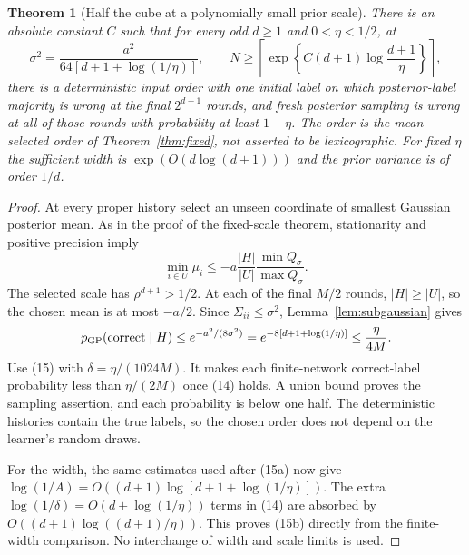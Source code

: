 \documentclass[11pt]{article}
\newtheorem{theorem}{Theorem}
\begin{document}
\begin{theorem}[Half the cube at a polynomially small prior scale]
There is an absolute constant $C$ such that for every odd $d\ge1$ and
$0<\eta<1/2$, at
\[
 \sigma^2=\frac{a^2}{64[d+1+\log(1/\eta)]},\qquad
 N\ge\left\lceil\exp\left\{C(d+1)\log\frac{d+1}{\eta}\right\}\right\rceil,
                                                               \tag{15b}
\]
there is a deterministic input order with one initial label on which
posterior-label majority is wrong at the final $2^{d-1}$ rounds, and
fresh posterior sampling is wrong at all of those rounds with probability
at least $1-\eta$. The order is the mean-selected order of Theorem~\ref{thm:fixed},
not asserted to be lexicographic. For fixed $\eta$ the sufficient width
is $\exp(O(d\log(d+1)))$ and the prior variance is of order $1/d$.
\end{theorem}
\begin{proof}
At every proper history select an unseen coordinate of smallest Gaussian
posterior mean. As in the proof of the fixed-scale theorem, stationarity
and positive precision imply
\[
 \min_{i\in U}\mu_i\le-a\frac{|H|}{|U|}
                         \frac{\min Q_\sigma}{\max Q_\sigma}.
\]
The selected scale has $\rho^{d+1}>1/2$. At each of the final $M/2$
rounds, $|H|\ge|U|$, so the chosen mean is at most $-a/2$.
Since $\Sigma_{ii}\le\sigma^2$, Lemma~\ref{lem:subgaussian} gives
\[
 p_{\rm GP}(\mathrm{correct}\mid H)
       \le e^{-a^2/(8\sigma^2)}
       =e^{-8[d+1+\log(1/\eta)]}\le\frac\eta{4M}.
\]
Use (15) with $\delta=\eta/(1024M)$. It makes each finite-network
correct-label probability less than $\eta/(2M)$ once (14) holds.
A union bound proves the sampling assertion, and each probability is
below one half. The deterministic histories contain the true labels,
so the chosen order does not depend on the learner's random draws.

For the width, the same estimates used after (15a) now give
$\log(1/A)=O((d+1)\log[d+1+\log(1/\eta)])$.
The extra $\log(1/\delta)=O(d+\log(1/\eta))$ terms in (14) are absorbed
by $O((d+1)\log((d+1)/\eta))$. This proves (15b) directly from the
finite-width comparison. No interchange of width and scale limits
is used.
\end{proof}
\end{document}
